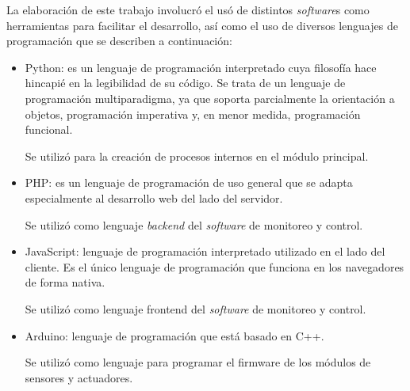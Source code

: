 La elaboración de este trabajo involucró el usó de distintos \emph{software}s como herramientas para facilitar el desarrollo, así como el uso de diversos lenguajes de programación que se describen a continuación:
\begin{itemize}
\item Python: es un lenguaje de programación interpretado cuya filosofía hace hincapié en la legibilidad de su código. Se trata de un lenguaje de programación multiparadigma, ya que soporta parcialmente la orientación a objetos, programación imperativa y, en menor medida, programación funcional.

Se utilizó para la creación de procesos internos en el módulo principal. 
\item PHP: es un lenguaje de programación de uso general que se adapta especialmente al desarrollo web del lado del servidor.

Se utilizó como lenguaje \emph{backend} del \emph{software} de monitoreo y control.
\item JavaScript: lenguaje de programación interpretado utilizado en el lado del cliente. Es el único lenguaje de programación que funciona en los navegadores de forma nativa.

Se utilizó como lenguaje frontend del \emph{software} de monitoreo y control.
\item Arduino: lenguaje de programación que está basado en C++.

Se utilizó como lenguaje para programar el firmware de los módulos de sensores y actuadores.
\end{itemize}